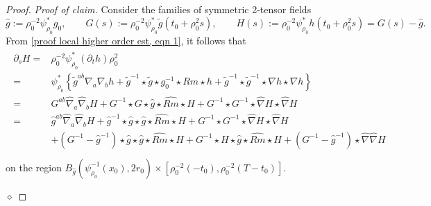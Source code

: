 \documentclass[12pt]{amsart}
\renewcommand{\1}{{\mathbf 1}}
\newenvironment{claimproof}{\par\noindent\textit{Proof of claim.}\space}{\hfill$\diamond$\medskip\par}
\theoremstyle{others}
\numberwithin{equation}{section}
\begin{document}
\begin{proof}
\begin{claimproof}
        Consider the families of symmetric 2-tensor fields
            $$\hat g := \rho_0^{-2} \psi_{\rho_0}^*  g_0 , \qquad 
            G(s) := \rho_0^{-2} \psi_{\rho_0}^* \tilde g(t_0 + \rho_0^2 s) , \qquad 
            H (s) := \rho_0^{-2} \psi_{\rho_0}^*  h ( t_0 + \rho_0^2 s) = G(s) - \hat g.$$
        From \eqref{proof local higher order est, eqn 1}, it follows that
        \begin{gather} \label{proof local higher order est, eqn 3} \begin{aligned}
            \partial_s H 
            ={}& \rho_0^{-2} \psi_{\rho_0}^* (\partial_t h ) \rho_0^2 \\
            ={}& \psi_{\rho_0}^* \left\{ \tilde g^{ab} \nabla_a \nabla_b h + \tilde g^{-1} \star \tilde g \star g_0^{-1} \star Rm \star h + \tilde g^{-1} \star \tilde g^{-1} \star \nabla h \star \nabla h \right\} \\
            ={}& G^{ab} \hat \nabla_a \hat \nabla_b H + G^{-1} \star G \star \hat g \star \hat {Rm} \star H + G^{-1} \star G^{-1} \star \hat \nabla H \star \hat \nabla H \\
            ={}& \hat g^{ab} \hat \nabla_a \hat \nabla_b H + \hat g^{-1} \star \hat g \star \hat g \star \hat {Rm} \star H + G^{-1} \star G^{-1} \star \hat \nabla H \star \hat \nabla H \\
            &+ ( G^{-1} - \hat g^{-1} ) \star \hat g \star \hat g \star \hat {Rm} \star H
            + G^{-1} \star H \star \hat g \star \hat {Rm} \star H
            + ( G^{-1} - \hat g^{-1} )\star  \hat \nabla \hat \nabla H\\
        \end{aligned} 
        \end{gather}
        on the region $B_{\hat g} (\psi_{\rho_0}^{-1} (x_0), 2 r_0) \times \left[ \rho_0^{-2}(-t_0) , \rho_0^{-2} ( T - t_0) \right]$.
    

\end{claimproof}
\end{proof}
\end{document}
